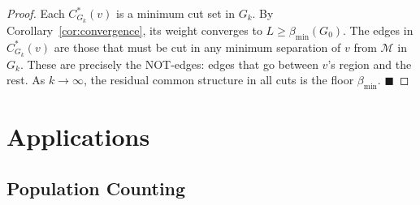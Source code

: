 \documentclass[12pt, a4paper]{article}
\theoremstyle{plain}
\theoremstyle{definition}
\theoremstyle{remark}
\newcommand{\med}{\mathcal{M}}
\newcommand{\bmin}{\beta_{\min}}
\newcommand{\qed}{\hfill$\blacksquare$}
\begin{document}
\begin{proof}
Each $C^*_{G_k}(v)$ is a minimum cut set in $G_k$. By
Corollary~\ref{cor:convergence}, its weight converges to $L \geq \bmin(G_0)$.
The edges in $C^*_{G_k}(v)$ are those that must be cut in any minimum
separation of $v$ from $\med$ in $G_k$. These are precisely the NOT-edges:
edges that go between $v$'s region and the rest. As $k \to \infty$, the
residual common structure in all cuts is the floor $\bmin$. \qed
\end{proof}

\section{Applications}
\label{sec:applications}

\subsection{Population Counting}
\end{document}
